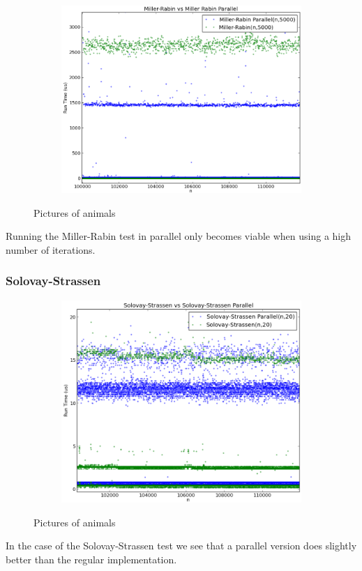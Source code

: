 \documentclass[compressed,final,notitlepage,narroweqnarray,inline,twoside,]{ieee}
\begin{document}
\begin{figure}[H]
        \centering
        \begin{subfigure}[b]{0.5\textwidth}
                \includegraphics[width=\textwidth]{../images/MR_MRP_large_runtime}
                \label{fig:gull}
        \end{subfigure}
        \caption{Pictures of animals}\label{fig:animals}
\end{figure}
Running the Miller-Rabin test in parallel only becomes viable when using a high number of iterations.
\subsubsection{Solovay-Strassen}
\begin{figure}[H]
        \centering
        \begin{subfigure}[b]{0.5\textwidth}
                \includegraphics[width=\textwidth]{../images/SS_SSP_runtime}
                \label{fig:gull}
        \end{subfigure}
        \caption{Pictures of animals}\label{fig:animals}
\end{figure}
In the case of the Solovay-Strassen test we see that a parallel version does slightly better than the regular implementation.
\end{document}
